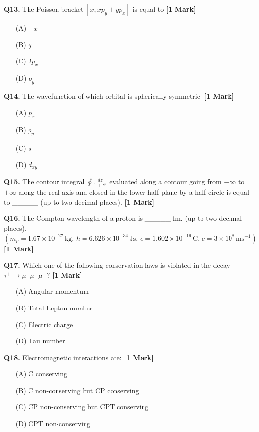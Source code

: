 \documentclass[11pt]{article}
\newcommand{\questiona}[2]{
    \noindent\textbf{Q#2.} #1 \hfill \textbf{[1 Mark]}
}
\begin{document}
\questiona{The Poisson bracket \([x, xp_y + yp_x]\) is equal to}{13}
\begin{enumerate}
    \item[(A)] \(-x\)
    \item[(B)] \(y\)
    \item[(C)] \(2p_x\)
    \item[(D)] \(p_y\)
\end{enumerate}
\vspace{0.5cm}

\questiona{The wavefunction of which orbital is spherically symmetric:}{14}
\begin{enumerate}
    \item[(A)] \(p_x\)
    \item[(B)] \(p_y\)
    \item[(C)] \(s\)
    \item[(D)] \(d_{xy}\)
\end{enumerate}
\vspace{0.5cm}

\questiona{The contour integral \(\oint \frac{dz}{1+z^2}\) evaluated along a contour going from \(-\infty\) to \(+\infty\) along the real axis and closed in the lower half-plane by a half circle is equal to \_\_\_\_\_ (up to two decimal places).}{15}
\vspace{0.5cm}

\questiona{The Compton wavelength of a proton is \_\_\_\_\_ fm. (up to two decimal places). \((m_p = 1.67 \times 10^{-27} \, \text{kg}, \, h = 6.626 \times 10^{-34} \, \text{Js}, \, e = 1.602 \times 10^{-19} \, \text{C}, \, c = 3 \times 10^8 \, \text{ms}^{-1})\)}{16}
\vspace{0.5cm}

\questiona{Which one of the following conservation laws is violated in the decay \( \tau^+ \rightarrow \mu^+ \mu^+ \mu^- \)?}{17}
\begin{enumerate}
    \item[(A)] Angular momentum
    \item[(B)] Total Lepton number
    \item[(C)] Electric charge
    \item[(D)] Tau number
\end{enumerate}
\vspace{0.5cm}

\questiona{Electromagnetic interactions are:}{18}
\begin{enumerate}
    \item[(A)] C conserving
    \item[(B)] C non-conserving but CP conserving
    \item[(C)] CP non-conserving but CPT conserving
    \item[(D)] CPT non-conserving
\end{enumerate}
\vspace{0.5cm}
\end{document}
